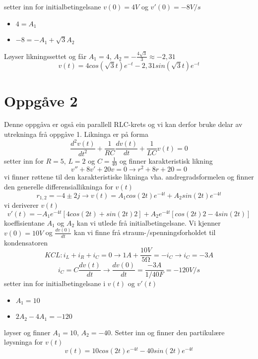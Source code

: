 \documentclass[12pt,a4paper]{article}
\begin{document}
    setter inn for initialbetingelsane $v(0) = 4V$ og $v'(0) = -8V/s$
    \begin{itemize}
      \item $4 = A_1$
      \item $-8 = -A_1 + \sqrt{3}A_2$
    \end{itemize}
    Løyser likningssettet og får $A_1 = 4$, $A_2 = -\frac{4\sqrt{3}}{3} \approx -2,31$
    \begin{equation}
      v(t) = 4cos(\sqrt{3}t)e^{-t} - 2,31sin(\sqrt{3}t)e^{-t}
    \end{equation}



  \section*{Oppgåve 2}
    Denne oppgåva er også ein parallell RLC-krets og vi kan derfor bruke delar av
    utrekninga frå oppgåve 1. Likninga er på forma
    \begin{equation}
      \frac{d^2v(t)}{dt^2} +
      \frac{1}{RC}\frac{dv(t)}{dt} +
      \frac{1}{LC}v(t) = 0
    \end{equation}
    setter inn for $R=5$, $L=2$ og $C=\frac{1}{40}$ og finner karakteristisk likning
    \begin{equation}
      v'' + 8v' + 20v = 0 \rightarrow
      r^2 + 8r + 20 = 0
    \end{equation}
    vi finner røttene til den karakteristiske likninga vha. andregradsformelen
    og finner den generelle differensiallikninga for $v(t)$
    \begin{equation}
      r_{1,2} = -4 \pm 2j
      \rightarrow v(t) = A_1 cos(2t)e^{-4t} + A_2 sin(2t)e^{-4t}
    \end{equation}
    vi deriverer $v(t)$
    \begin{equation}
      v'(t) = -A_1 e^{-4t} \left[ 4cos(2t)+sin(2t)2 \right] +
        A_2 e^{-4t} \left[ cos(2t)2 - 4sin(2t) \right]
    \end{equation}
    koeffisientane $A_1$ og $A_2$ kan vi utlede frå initialbetingelsane. Vi kjenner
    $v(0) = 10V$ og $\frac{dv(0)}{dt}$ kan vi finne frå straum-/spenningsforholdet
    til kondensatoren
    \begin{equation}
      KCL: i_L + i_R + i_C = 0  \rightarrow 1A + \frac{10V}{5\si{\ohm}} = -i_C
      \rightarrow i_C = -3A
    \end{equation}
    \begin{equation}
      i_C = C\frac{dv(t)}{dt} \rightarrow
      \frac{dv(0)}{dt} = \frac{-3A}{1/40F} = -120V/s
    \end{equation}
    setter inn for initialbetingelsane i $v(t)$ og $v'(t)$
    \begin{itemize}
      \item $A_1 = 10$
      \item $2A_2 - 4A_1 = -120$
    \end{itemize}
    løyser og finner $A_1 = 10$, $A_2 = -40$. Setter inn og finner den partikulære
    løysninga for $v(t)$
    \begin{equation}
      v(t) = 10 cos(2t)e^{-4t} - 40 sin(2t)e^{-4t}
    \end{equation}
\end{document}
